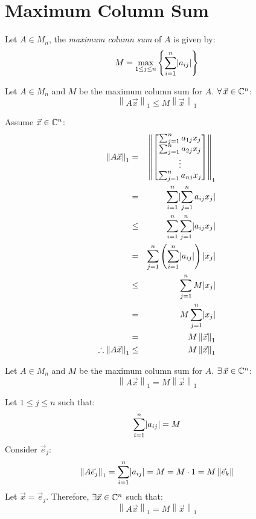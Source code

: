\documentclass[letterpaper,12pt,fleqn]{article}
\newcommand{\vx}{\vec{x}}
\newcommand{\ve}{\vec{e}}
\newcommand{\norm}[1]{\left\lVert#1\right\rVert}
\begin{document}
\section*{Maximum Column Sum}

\begin{definition}
  Let $A\in M_n$, the \emph{maximum column sum} of $A$ is given by:
  \[M=\max_{1\le j\le n}\left\{\sum_{i=1}^n\lvert a_{ij}\rvert\right\}\]
\end{definition}

\begin{lemma}
  Let $A\in M_n$ and $M$ be the maximum column sum for $A$.
  $\forall\,\vx\in\C^n$:
  \[\norm{A\vx}_1\le M\norm{\vx}_1\]
\end{lemma}

\begin{theproof}
  Assume $\vx\in\C^n$:
  \begin{eqnarray*}
    \norm{A\vx}_1 &=& \norm{\begin{bmatrix}
        \sum_{j=1}^na_{1j}x_j \\
        \sum_{j=1}^na_{2j}x_j \\
        \vdots \\
        \sum_{j=1}^na_{nj}x_j
    \end{bmatrix}}_1 \\
    &=& \sum_{i=1}^n\abs{\sum_{j=1}^na_{ij}x_j} \\
    &\le& \sum_{i=1}^n\sum_{j=1}^n\abs{a_{ij}x_j} \\
    &=& \sum_{j=1}^n\left(\sum_{i=1}^n\abs{a_{ij}}\right)\abs{x_j} \\
    &\le& \sum_{j=1}^nM\abs{x_j} \\
    &=& M\sum_{j=1}^n\abs{x_j} \\
    &=& M\norm{\vx}_1 \\
    \therefore\norm{A\vx}_1 &\le& M\norm{\vx}_1
  \end{eqnarray*}
\end{theproof}

\begin{lemma}
  Let $A\in M_n$ and $M$ be the maximum column sum for $A$.
  $\exists\,\vx\in\C^n$:
  \[\norm{A\vx}_1=M\norm{\vx}_1\]
\end{lemma}
\newpage
\begin{theproof}
  Let $1\le j\le n$ such that:
  \[\sum_{i=1}^n\lvert a_{ij}\rvert=M\]
  Consider $\ve_j$:
  \[\norm{A\ve_j}_1=\sum_{i=1}^n\abs{a_{ij}}=M=M\cdot1=M\norm{\ve_k}\]
  Let $\vx=\ve_j$. Therefore, $\exists\vx\in\C^n$ such that:
  \[\norm{A\vx}_1=M\norm{\vx}_1\]
\end{theproof}
\end{document}
